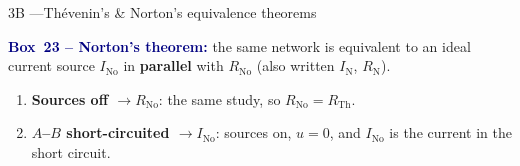 \documentclass[10pt,a4paper]{article}
\newlength{\colw}
\newenvironment{column}{\begin{minipage}[t]{\colw}\vspace{0pt}}{\end{minipage}}
\newcommand{\RTh}{R_{\mathrm{Th}}}
\newcommand{\INo}{I_{\mathrm{No}}}
\newcommand{\RNo}{R_{\mathrm{No}}}
\newcommand{\bx}[2]{\textcolor{navy}{\textbf{Box~#1 -- #2}}}
\begin{document}
\begin{column}
\begin{panel}{3B \enspace---\enspace Thévenin's \& Norton's equivalence theorems}
\begin{enumerate}
\end{enumerate}
\bx{23}{Norton's theorem:} the same network is equivalent to an ideal current source
$\INo$ in \textbf{parallel} with $\RNo$ (also written $I_{\mathrm{N}}$, $R_{\mathrm{N}}$).
\begin{enumerate}
  \item \textbf{Sources off $\to \RNo$}: the same study, so $\RNo = \RTh$.
  \item \textbf{$A$--$B$ short-circuited $\to \INo$}: sources on, $u = 0$, and $\INo$ is
    the current in the short circuit.
\end{enumerate}
\end{panel}
\end{column}

\newpage
\noindent
\end{document}
